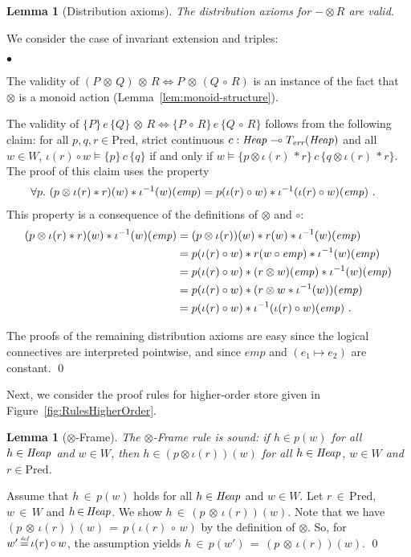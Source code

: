 \documentclass{LMCS}
\newtheorem{lemma}[theorem]{Lemma}
\theoremstyle{remark}
\newcommand{\defeq}{\ensuremath{\stackrel{\mbox{\tiny \it def}}{=}}}
\newcommand{\TERR}{\ensuremath{T_\textit{err}}\xspace}
\newcommand{\IFF}{\ensuremath{\Leftrightarrow}}
\newcommand{\sto}{\ensuremath{\multimap}}
\newcommand{\triple}[3]{{\ensuremath{\!\left.\{ #1 \}\, #2\, \{  #3 \}\!\right.}}}
\newcommand{\pointsto}{\ensuremath{\mapsto}}
\newcommand{\EMP}{\ensuremath{\textit{emp}}}
\newcommand{\wemp}{\textnormal{\textit{emp}}}
\newcommand{\Pred}{\ensuremath{\mathrm{Pred}}\xspace}
\newcommand{\W}{\ensuremath{W}}
\newcommand{\FOLD}{\ensuremath{\iota}}
\newcommand{\UNFOLD}{\ensuremath{\iota^{-1}}}
\begin{document}
\begin{lemma}[Distribution axioms]
\label{lem:soundness:distribution}
The  distribution axioms for $-\otimes R$ 
are valid.
\end{lemma}
\proof
We consider the case of invariant extension and triples:
\begin{iteMize}{$\bullet$}
\item The validity of $(P\,{\otimes}\,Q)\,{\otimes}\,R\IFF P\,{\otimes}\,(Q\,{\circ}\,R)$ is an instance of the fact that $\otimes$ is a monoid action (Lemma~\ref{lem:monoid-structure}). 
\item The validity of $\triple{P}{e}{Q}\,{\otimes}\, R\IFF \triple{P\,{\circ}\,R}{e}{Q\,{\circ}\,R}$  follows from the following claim: for all $p,q,r\in\Pred$, strict continuous $c:\Heap\sto\TERR(\Heap)$ and all $w\in\W$,
$\FOLD(r)\circ w \models\triple{p}{c}{q}$ if and only if  
$w\models\triple{p\otimes\FOLD(r)\,*r}{c}{q\otimes\FOLD(r)\,*r}$.
The proof of this claim uses the property 
\begin{align*}
\forall p.\ (p\otimes\FOLD(r) * r)(w) * \UNFOLD(w)(\wemp) 
&= p(\FOLD(r)\circ w) * \UNFOLD(\FOLD(r)\circ w)(\wemp) \ .
\end{align*}
This property  is a  consequence of the definitions of $\otimes$ and $\circ$: 
\begin{align*}
(p\otimes\FOLD(r) * r)(w) * \UNFOLD(w)(\wemp) 
&= (p\otimes\FOLD(r))(w) * r(w) * \UNFOLD(w)(\wemp) \\
&= p(\FOLD(r)\circ w) * r(w\circ\wemp) * \UNFOLD(w)(\wemp)\\
&= p(\FOLD(r)\circ w) * (r\otimes w)(\wemp) * \UNFOLD(w)(\wemp)\\
&= p(\FOLD(r)\circ w) * (r\otimes w * \UNFOLD(w))(\wemp)\\
&= p(\FOLD(r)\circ w) * \UNFOLD(\FOLD(r)\circ w)(\wemp)\ .
\end{align*}
\end{iteMize} 
The proofs of the remaining distribution axioms are easy since the  logical connectives are interpreted   pointwise, and since $\EMP$ 
and $(e_1\pointsto e_2)$ are constant. \qed



Next, we consider the proof rules for higher-order store given in  
Figure~\ref{fig:RulesHigherOrder}. 

\begin{lemma}[$\otimes$-Frame]
\label{lem:higher-order-frame-rule}
The {\sc $\otimes$-Frame} rule is sound: if 
 $h\in {p} (w)$ for all $h\in\mathit{Heap}$ and $w\in\W$,
then  $h\in (p\otimes \FOLD(r)) (w)$ 
for all $h\in\mathit{Heap}$, $w\in\W$ and $r\in\Pred$. 
\end{lemma}
\proof
Assume that $h\,{\in}\,{p}(w)$ holds for all $h\in\mathit{Heap}$ and $w\in\W$. Let $r\,{\in}\,\Pred$,
$w\,{\in}\,\W$ and $h\,{\in}\,\mathit{Heap}$. 
We show $h\,{\in}\,(p\,{\otimes}\,\FOLD(r)) (w)$. 
Note that we have $(p\,{\otimes}\, \FOLD(r)) (w)  \,{=}\, p(\FOLD(r)\,{\circ}\, w)$
by the definition of $\otimes$.
So,  for $w'\,{\defeq}\,\FOLD(r)\,{\circ}\,w$, the assumption yields $h\,{\in}\, p(w') 
\,{=}\, (p\,{\otimes}\,\FOLD(r)) (w)$.
\qed
\end{document}
